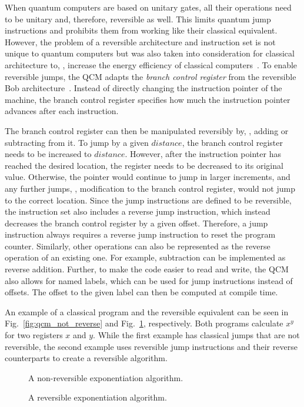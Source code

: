 When quantum computers are based on unitary gates, all their operations need to be unitary and, therefore, reversible as well. This limits quantum jump instructions and prohibits them from working like their classical equivalent. However, the problem of a reversible architecture and instruction set is not unique to quantum computers but was also taken into consideration for classical architecture to, \eg, increase the energy efficiency of classical computers~\cite{AGY07, TAG12}. 
To enable reversible jumps, the QCM adapts the \emph{branch control register} from the reversible Bob architecture~\cite{TAG12}. Instead of directly changing the instruction pointer of the machine, the branch control register specifies how much the instruction pointer advances after each instruction.

The branch control register can then be manipulated reversibly by, \eg, adding or subtracting from it. To jump by a given $distance$, the branch control register needs to be increased to $distance$. However, after the instruction pointer has reached the desired location, the register needs to be decreased to its original value. Otherwise, the pointer would continue to jump in larger increments, and any further jumps, \ie, modification to the branch control register, would not jump to the correct location. Since the jump instructions are defined to be reversible, the instruction set also includes a reverse jump instruction, which instead decreases the branch control register by a given offset. Therefore, a jump instruction always requires a reverse jump instruction to reset the program counter. Similarly, other operations can also be represented as the reverse operation of an existing one. For example, subtraction can be implemented as reverse addition. Further, to make the code easier to read and write, the QCM also allows for named labels, which can be used for jump instructions instead of offsets. The offset to the given label can then be computed at compile time. 

An example of a classical program and the reversible equivalent can be seen in Fig.~\ref{fig:qcm_not_reverse} and Fig.~\ref{fig:qcm_reverse}, respectively. Both programs calculate $x^y$ for two registers $x$ and $y$. While the first example has classical jumps that are not reversible, the second example uses reversible jump instructions and their reverse counterparts to create a reversible algorithm.

\begin{figure}[htp]
    \centering     
    \begin{minipage}{.40\textwidth}
        
        \caption{A non-reversible exponentiation algorithm.}
        \label{fig:qcm_not_reverse}
    \end{minipage}
    \hfill
    \begin{minipage}{.50\textwidth}
        
        \caption{A reversible exponentiation algorithm.}    
        \label{fig:qcm_reverse}
    \end{minipage}
\end{figure}

